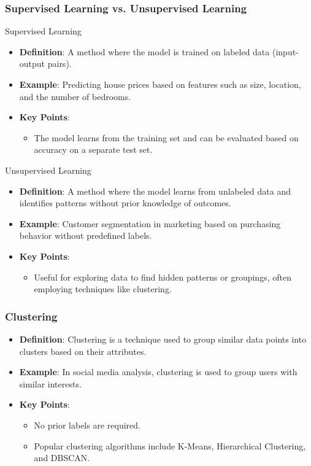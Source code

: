 \documentclass[aspectratio=169]{beamer}
\begin{document}
\begin{frame}[fragile]
    \frametitle{Supervised Learning vs. Unsupervised Learning}
    \begin{block}{Supervised Learning}
        \begin{itemize}
            \item \textbf{Definition}: A method where the model is trained on labeled data (input-output pairs).
            \item \textbf{Example}: Predicting house prices based on features such as size, location, and the number of bedrooms.
            \item \textbf{Key Points}: 
            \begin{itemize}
                \item The model learns from the training set and can be evaluated based on accuracy on a separate test set.
            \end{itemize}
        \end{itemize}
    \end{block}

    \begin{block}{Unsupervised Learning}
        \begin{itemize}
            \item \textbf{Definition}: A method where the model learns from unlabeled data and identifies patterns without prior knowledge of outcomes.
            \item \textbf{Example}: Customer segmentation in marketing based on purchasing behavior without predefined labels.
            \item \textbf{Key Points}: 
            \begin{itemize}
                \item Useful for exploring data to find hidden patterns or groupings, often employing techniques like clustering.
            \end{itemize}
        \end{itemize}
    \end{block}
\end{frame}

\begin{frame}[fragile]
    \frametitle{Clustering}
    \begin{itemize}
        \item \textbf{Definition}: Clustering is a technique used to group similar data points into clusters based on their attributes.
        \item \textbf{Example}: In social media analysis, clustering is used to group users with similar interests.
        \item \textbf{Key Points}: 
        \begin{itemize}
            \item No prior labels are required.
            \item Popular clustering algorithms include K-Means, Hierarchical Clustering, and DBSCAN.
        \end{itemize}
    \end{itemize}
\end{frame}
\end{document}
